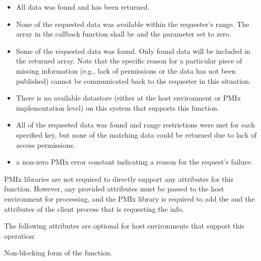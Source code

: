 \begin{itemize}
\item {} All data was found and has been returned.

\item {} None of the requested data was available within the requester's range. The  array in the callback function shall be  and the  parameter set to zero.

\item {} Some of the requested data was found.
Only found data will be included in the returned  array. Note that the specific reason for a particular piece of missing information (e.g., lack of permissions or the data has not been published) cannot be communicated back to the requester in this situation.

\item {} There is no available datastore (either at the host environment or \ac{PMIx} implementation level) on this system that supports this function.

\item {} All of the requested data was found and range restrictions were met for each specified key, but none of the matching data could be returned due to lack of access permissions.

\item a non-zero \ac{PMIx} error constant indicating a reason for the request's failure.
\end{itemize}

\reqattrstart
\ac{PMIx} libraries are not required to directly support any attributes for this function. However, any provided attributes must be passed to the host environment for processing, and the \ac{PMIx} library is required to add the  and the  attributes of the client process that is requesting the info.

\reqattrend

\optattrstart
The following attributes are optional for host environments that support this operation:


\optattrend

\descr

Non-blocking form of the  function.

